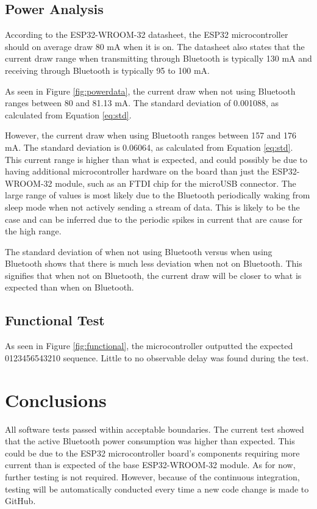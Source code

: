 \documentclass[12pt]{article}
\begin{document}
\subsection{Power Analysis}
According to the ESP32-WROOM-32 datasheet, the ESP32 microcontroller should on average draw 80 mA when it is on. The datasheet also states that the current draw range when transmitting through Bluetooth is typically 130 mA and receiving through Bluetooth is typically 95 to 100 mA.

As seen in Figure \ref{fig:powerdata}, the current draw when not using Bluetooth ranges between 80 and 81.13 mA. The standard deviation of 0.001088, as calculated from Equation \ref{eq:std}.

However, the current draw when using Bluetooth ranges between 157 and 176 mA. The standard deviation is 0.06064, as calculated from Equation \ref{eq:std}. This current range is higher than what is expected, and could possibly be due to having additional microcontroller hardware on the board than just the ESP32-WROOM-32 module, such as an FTDI chip for the microUSB connector. The large range of values is most likely due to the Bluetooth periodically waking from sleep mode when not actively sending a stream of data. This is likely to be the case and can be inferred due to the periodic spikes in current that are cause for the high range.

The standard deviation of when not using Bluetooth versus when using Bluetooth shows that there is much less deviation when not on Bluetooth. This signifies that when not on Bluetooth, the current draw will be closer to what is expected than when on Bluetooth.

\subsection{Functional Test}
As seen in Figure \ref{fig:functional}, the microcontroller outputted the expected 0123456543210 sequence. Little to no observable delay was found during the test.

\section{Conclusions}
All software tests passed within acceptable boundaries. The current test showed that the active Bluetooth power consumption was higher than expected. This could be due to the ESP32 microcontroller board's components requiring more current than is expected of the base ESP32-WROOM-32 module.  As for now, further testing is not required. However, because of the continuous integration, testing will be automatically conducted every time a new code change is made to GitHub.
\end{document}
